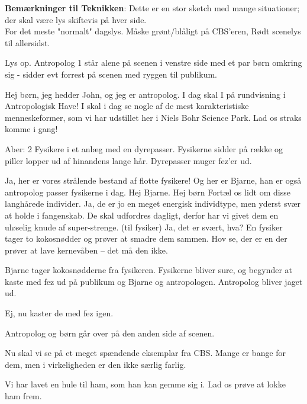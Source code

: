 \documentclass[a4paper,12pt]{article}
\begin{document}
\begin{sketch}

\textbf{Bemærkninger til Teknikken}: Dette er en stor sketch med mange situationer; der skal være lys skiftevis på hver side.\\ For det meste "normalt" dagslys. Måske grønt/blåligt på CBS'eren, Rødt scenelys til allersidst.

\scene Lys op. Antropolog 1 står alene på scenen i venstre side med et par børn omkring sig - sidder evt forrest på scenen med ryggen til publikum.

 Hej børn, jeg hedder John, og jeg er antropolog. I dag skal I på rundvisning i Antropologisk Have! I skal i dag se nogle af de mest karakteristiske menneskeformer, som vi har udstillet her i Niels Bohr Science Park. Lad os straks komme i gang!\\



\scene Aber: 2 Fysikere i et anlæg med en dyrepasser. Fysikerne sidder på række og piller lopper ud af hinandens lange hår. Dyrepasser muger fez'er ud.

 Ja, her er vores strålende bestand af flotte fysikere! Og her er Bjarne, han er også antropolog passer fysikerne i dag. Hej Bjarne.
 Hej børn
Fortæl os lidt om disse langhårede individer.
Ja, de er jo en meget energisk individtype, men yderst svær at holde i fangenskab. De skal udfordres dagligt, derfor har vi givet dem en uløselig knude af super-strenge. (til fysiker) Ja, det er svært, hva?
\scene En fysiker tager to kokosnødder og prøver at smadre dem sammen.
Hov se, der er en der prøver at lave kernevåben -- det må den ikke.

\scene Bjarne tager kokosnødderne fra fysikeren. Fysikerne bliver sure, og begynder at kaste med fez ud på publikum og Bjarne og antropologen. Antropolog bliver jaget ud.

Ej, nu kaster de med fez igen.

\scene Antropolog og børn går over på den anden side af scenen.

 Nu skal vi se på et meget spændende eksemplar fra CBS. Mange er bange for dem, men i virkeligheden er den ikke særlig farlig.

Vi har lavet en hule til ham, som han kan gemme sig i. Lad os prøve at lokke ham frem.


\end{sketch}
\end{document}
